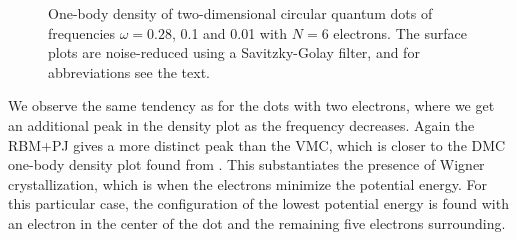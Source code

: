 \begin{figure}
	\hspace{0.1cm}
	\hspace{-0.cm}
	\hspace{-0.cm}
	
	\caption{One-body density of two-dimensional circular quantum dots of frequencies $\omega=0.28$, 0.1 and 0.01 with $N=6$ electrons. The surface plots are noise-reduced using a Savitzky-Golay filter, and for abbreviations see the text.}
	\label{fig:lowfreq6P}
\end{figure}

We observe the same tendency as for the dots with two electrons, where we get an additional peak in the density plot as the frequency decreases. Again the RBM+PJ gives a more distinct peak than the VMC, which is closer to the DMC one-body density plot found from \citet{hogberget_quantum_2013}. This substantiates the presence of Wigner crystallization, which is when the electrons minimize the potential energy. For this particular case, the configuration of the lowest potential energy is found with an electron in the center of the dot and the remaining five electrons surrounding. 

